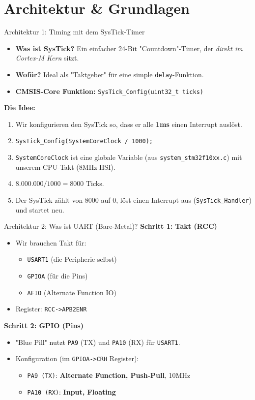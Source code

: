 \documentclass{beamer}
\begin{document}
\section{Architektur \& Grundlagen}

\begin{frame}{Architektur 1: Timing mit dem SysTick-Timer}
	\begin{itemize}
		\item \textbf{Was ist SysTick?} Ein einfacher 24-Bit "Countdown"-Timer, der \textit{direkt im Cortex-M Kern} sitzt.
		\item \textbf{Wofür?} Ideal als "Taktgeber" für eine simple \texttt{delay}-Funktion.
		\item \textbf{CMSIS-Core Funktion:} \texttt{SysTick\_Config(uint32\_t ticks)}
	\end{itemize}
	\textbf{Die Idee:}
	\begin{enumerate}
		\item Wir konfigurieren den SysTick so, dass er alle \textbf{1ms} einen Interrupt auslöst.
		\item \texttt{SysTick\_Config(SystemCoreClock / 1000);}
		\item \texttt{SystemCoreClock} ist eine globale Variable (aus \texttt{system\_stm32f10xx.c}) mit unserem CPU-Takt (8MHz HSI).
		\item $8.000.000 / 1000 = 8000$ Ticks.
		\item Der SysTick zählt von 8000 auf 0, löst einen Interrupt aus (\texttt{SysTick\_Handler}) und startet neu.
	\end{enumerate}
\end{frame}

\begin{frame}{Architektur 2: Was ist UART (Bare-Metal)?}
	\textbf{Schritt 1: Takt (RCC)}
	\begin{itemize}
		\item Wir brauchen Takt für:
		\begin{itemize}
			\item \texttt{USART1} (die Peripherie selbst)
			\item \texttt{GPIOA} (für die Pins)
			\item \texttt{AFIO} (Alternate Function IO)
		\end{itemize}
		\item Register: \texttt{RCC->APB2ENR}
	\end{itemize}
	
	\textbf{Schritt 2: GPIO (Pins)}
	\begin{itemize}
		\item "Blue Pill" nutzt \texttt{PA9} (TX) und \texttt{PA10} (RX) für \texttt{USART1}.
		\item Konfiguration (im \texttt{GPIOA->CRH} Register):
		\begin{itemize}
			\item \texttt{PA9 (TX)}: \textbf{Alternate Function, Push-Pull}, 10MHz
			\item \texttt{PA10 (RX)}: \textbf{Input, Floating}
		\end{itemize}
	\end{itemize}
\end{frame}
\end{document}
